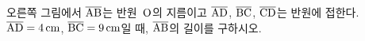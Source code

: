 \noindent\begin{minipage}[t]{0.58\linewidth}\vspace{0pt}\raggedright 오른쪽 그림에서 $\overline{\mathrm{AB}}$는 반원~$\mathrm{O}$의 지름이고 $\overline{\mathrm{AD}}$, $\overline{\mathrm{BC}}$, $\overline{\mathrm{CD}}$는 반원에 접한다. $\overline{\mathrm{AD}}=4\,\mathrm{cm}$, $\overline{\mathrm{BC}}=9\,\mathrm{cm}$일 때, $\overline{\mathrm{AB}}$의 길이를 구하시오.\end{minipage}\hfill\begin{minipage}[t]{0.4\linewidth}\vspace{0pt}\centering \resizebox{\ifdim\width>\linewidth\linewidth\else\width\fi}{!}{}\end{minipage}\par
